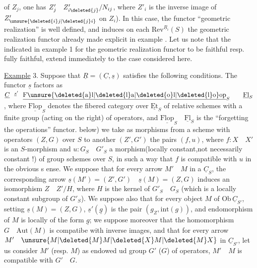 of $Z_j$, one has $Z'_j\quad Z'_{i\deleted{j}}/N_{ij}$, where $Z'_i$ is the inverse image of $Z'_{\unsure{\deleted{i}j|\deleted{j}i}}$ on $Z_i$). In this case, the functor ``geometric realization'' is well defined, and induces on each $\mathrm{Rev}^{\underline{R}_i}(S)$ the geometric realization functor already made explicit in example .  Let us note that the  indicated in example 1 for the geometric realization functor to be faithful resp. fully faithful, extend immediately to the case considered here.

\uline{Example} 3. Suppose that $\underline{R}=(\underline{C},\underline{s})$ satisfies the following conditions. The functor $\underline{s}$ factors as $\underline{C}\overset{\underline{s}'}{\qquad}\underline{\mathrm{F\unsure{\deleted{a}l|\deleted{l}a|\deleted{o}l|\deleted{l}o}op}}_S\qquad\underline{\mathrm{Fl}}_S$, where $\underline{\mathrm{Flop}}_S$ denotes the fibered category over $\underline{\mathrm{Et}}_S$ of relative schemes with a finite group (acting on the right) of operators, and $\underline{\mathrm{Flop}}_S\quad\underline{\mathrm{Fl}}_S$ is the ``forgetting the operations'' functor.  below) we take as morphisms from a scheme with operators $(Z,G)$ over $S$ to another $(Z',G')$ the pairs $(f,u)$, where $f:X\quad X'$ is an $S$-morphism and $u:G_S\quad G'_S$ a morphism(locally constant,not necessarily constant !) of group schemes over $S$, in such a way that $f$ is compatible with $u$ in the obvious s ense. We suppose that for every arrow $M'\quad M$ in a $\underline{C}_S$,  the corresponding arrow $\underline{s}(M')=(Z',G')\quad\underline{s}(M)=(Z,G)$ induces an isomorphism $Z\quad Z'/H$, where $H$ is the kernel of $G'_S\quad G_S$ (which is a locally constant subgroup of $G'_S$). We suppose  also that for every object $M$ of $\mathrm{Ob}\,\underline{C}_{S'}$, setting $\underline{s}(M)=(Z,G)$,  $\underline{s}'(\underline{g})$ is the pair $(g_Z,\mathrm{int}(g))$, and  endomorphism of $M$ is locally of the form $\underline{g}$; we  suppose moreover that  the homomorphism $G\quad\mathrm{Aut}(M)$ is compatibe with inverse images, and that for every arrow $M'\quad \unsure{M|\deleted{M}M|\deleted{X}M|\deleted{M}X}$ in $\underline{C}_{S'}$, let us consider $M'$ (resp. $M$) as endowed ud group $G'$ ($G$) of operators, $M'\quad M$ is compatible with $G'\quad G$.
